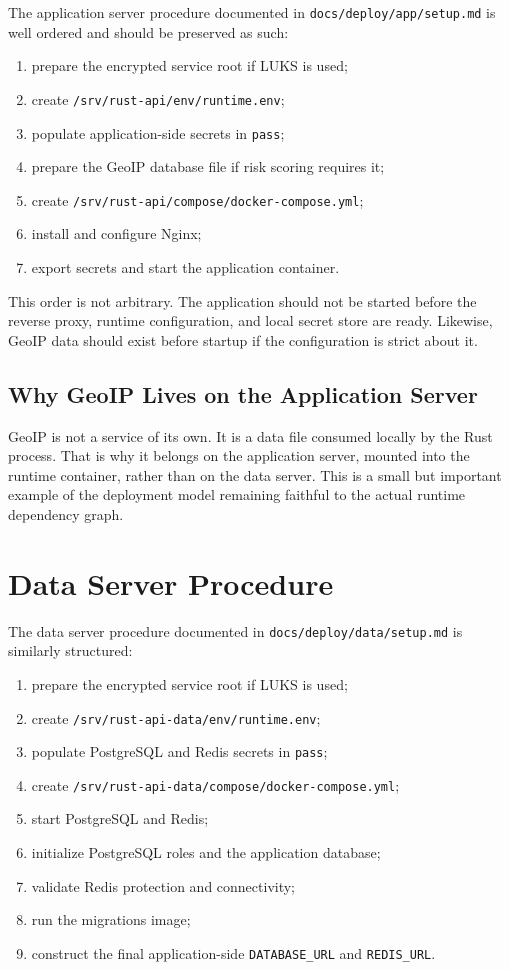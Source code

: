 \documentclass[11pt,a4paper]{article}
\begin{document}
The application server procedure documented in \texttt{docs/deploy/app/setup.md} is well ordered and should be preserved as such:

\begin{enumerate}
  \item prepare the encrypted service root if LUKS is used;
  \item create \texttt{/srv/rust-api/env/runtime.env};
  \item populate application-side secrets in \texttt{pass};
  \item prepare the GeoIP database file if risk scoring requires it;
  \item create \texttt{/srv/rust-api/compose/docker-compose.yml};
  \item install and configure Nginx;
  \item export secrets and start the application container.
\end{enumerate}

This order is not arbitrary. The application should not be started before the reverse proxy, runtime configuration, and local secret store are ready. Likewise, GeoIP data should exist before startup if the configuration is strict about it.

\subsection{Why GeoIP Lives on the Application Server}

GeoIP is not a service of its own. It is a data file consumed locally by the Rust process. That is why it belongs on the application server, mounted into the runtime container, rather than on the data server. This is a small but important example of the deployment model remaining faithful to the actual runtime dependency graph.

\section{Data Server Procedure}

The data server procedure documented in \texttt{docs/deploy/data/setup.md} is similarly structured:

\begin{enumerate}
  \item prepare the encrypted service root if LUKS is used;
  \item create \texttt{/srv/rust-api-data/env/runtime.env};
  \item populate PostgreSQL and Redis secrets in \texttt{pass};
  \item create \texttt{/srv/rust-api-data/compose/docker-compose.yml};
  \item start PostgreSQL and Redis;
  \item initialize PostgreSQL roles and the application database;
  \item validate Redis protection and connectivity;
  \item run the migrations image;
  \item construct the final application-side \texttt{DATABASE\_URL} and \texttt{REDIS\_URL}.
\end{enumerate}
\end{document}
